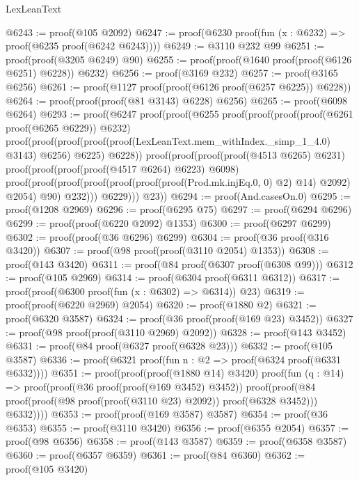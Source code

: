 \begin{lexlean}{LexLeanText}
\begin{coremodule}
@6243 := proof(@105 @2092)
@6247 := proof(@6230 proof(fun (x : @6232) => proof(@6235 proof(@6242 @6243))))
@6249 := @3110 @232 @99
@6251 := proof(proof(@3205 @6249) @90)
@6255 := proof(proof(@1640 proof(proof(@6126 @6251) @6228)) @6232)
@6256 := proof(@3169 @232)
@6257 := proof(@3165 @6256)
@6261 := proof(@1127 proof(proof(@6126 proof(@6257 @6225)) @6228))
@6264 := proof(proof(proof(@81 @3143) @6228) @6256)
@6265 := proof(@6098 @6264)
@6293 := proof(@6247
      proof(proof(@6255
            proof(proof(proof(proof(@6261 proof(@6265 @6229)) @6232)
                  proof(proof(proof(proof(proof(LexLeanText.mem_withIndex._simp_1_4.{0}) @3143)
                          @6256)
                        @6225)
                      @6228))
                proof(proof(proof(proof(@4513 @6265) @6231)
                      proof(proof(proof(proof(@4517 @6264) @6223) @6098)
                          proof(proof(proof(proof(proof(proof(proof(Prod.mk.injEq.{0, 0}) @2) @14)
                                    @2092)
                                  @2054)
                                @90)
                              @232)))
                    @6229)))
          @23))
@6294 := proof(And.casesOn.{0})
@6295 := proof(@1208 @2969)
@6296 := proof(@6295 @75)
@6297 := proof(@6294 @6296)
@6299 := proof(proof(@6220 @2092) @1353)
@6300 := proof(@6297 @6299)
@6302 := proof(proof(@36 @6296) @6299)
@6304 := proof(@36 proof(@316 @3420))
@6307 := proof(@98 proof(proof(@3110 @2054) @1353))
@6308 := proof(@143 @3420)
@6311 := proof(@84 proof(@6307 proof(@6308 @99)))
@6312 := proof(@105 @2969)
@6314 := proof(@6304 proof(@6311 @6312))
@6317 := proof(proof(@6300 proof(fun (x : @6302) => @6314)) @23)
@6319 := proof(proof(@6220 @2969) @2054)
@6320 := proof(@1880 @2)
@6321 := proof(@6320 @3587)
@6324 := proof(@36 proof(proof(@169 @23) @3452))
@6327 := proof(@98 proof(proof(@3110 @2969) @2092))
@6328 := proof(@143 @3452)
@6331 := proof(@84 proof(@6327 proof(@6328 @23)))
@6332 := proof(@105 @3587)
@6336 := proof(@6321 proof(fun {n : @2} => proof(@6324 proof(@6331 @6332))))
@6351 := proof(proof(proof(@1880 @14) @3420)
      proof(fun (q : @14) =>
        proof(proof(@36 proof(proof(@169 @3452) @3452))
            proof(proof(@84 proof(proof(@98 proof(proof(@3110 @23) @2092)) proof(@6328 @3452)))
                @6332))))
@6353 := proof(proof(@169 @3587) @3587)
@6354 := proof(@36 @6353)
@6355 := proof(@3110 @3420)
@6356 := proof(@6355 @2054)
@6357 := proof(@98 @6356)
@6358 := proof(@143 @3587)
@6359 := proof(@6358 @3587)
@6360 := proof(@6357 @6359)
@6361 := proof(@84 @6360)
@6362 := proof(@105 @3420)

\end{coremodule}
\end{lexlean}
